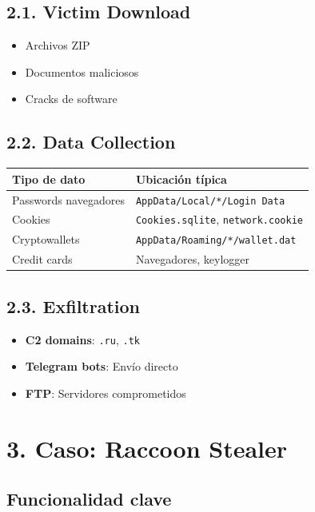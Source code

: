 \documentclass[
  letterpaper,
]{report}
\newcounter{none} %
\providecommand{\tightlist}{%
  \setlength{\itemsep}{0pt}\setlength{\parskip}{0pt}}
\begin{document}
\subsection{2.1. Victim Download}\label{victim-download}

\begin{itemize}
\tightlist
\item
  Archivos ZIP
\item
  Documentos maliciosos
\item
  Cracks de software
\end{itemize}

\subsection{2.2. Data Collection}\label{data-collection}

{\def\LTcaptype{none} %
\begin{longtable}[]{@{}ll@{}}
\toprule\noalign{}
Tipo de dato & Ubicación típica \\
\midrule\noalign{}
\endhead
\bottomrule\noalign{}
\endlastfoot
Passwords navegadores & \texttt{AppData/Local/*/Login\ Data} \\
Cookies & \texttt{Cookies.sqlite}, \texttt{network.cookie} \\
Cryptowallets & \texttt{AppData/Roaming/*/wallet.dat} \\
Credit cards & Navegadores, keylogger \\
\end{longtable}
}

\subsection{2.3. Exfiltration}\label{exfiltration}

\begin{itemize}
\tightlist
\item
  \textbf{C2 domains}: \texttt{.ru}, \texttt{.tk}
\item
  \textbf{Telegram bots}: Envío directo
\item
  \textbf{FTP}: Servidores comprometidos
\end{itemize}

\section{3. Caso: Raccoon Stealer}\label{caso-raccoon-stealer}

\subsection{Funcionalidad clave}\label{funcionalidad-clave}
\end{document}

